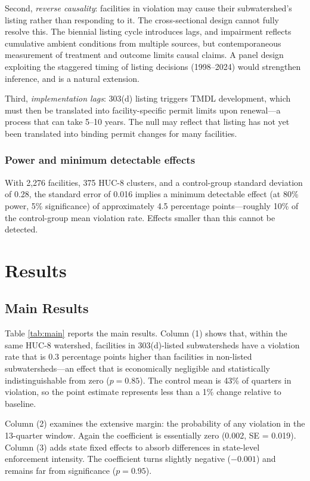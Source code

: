 \documentclass[12pt]{article}
\begin{document}
Second, \textit{reverse causality}: facilities in violation may cause their subwatershed's listing rather than responding to it. The cross-sectional design cannot fully resolve this. The biennial listing cycle introduces lags, and impairment reflects cumulative ambient conditions from multiple sources, but contemporaneous measurement of treatment and outcome limits causal claims. A panel design exploiting the staggered timing of listing decisions (1998--2024) would strengthen inference, and is a natural extension.

Third, \textit{implementation lags}: 303(d) listing triggers TMDL development, which must then be translated into facility-specific permit limits upon renewal---a process that can take 5--10 years. The null may reflect that listing has not yet been translated into binding permit changes for many facilities.

\subsubsection*{Power and minimum detectable effects} With 2,276 facilities, 375 HUC-8 clusters, and a control-group standard deviation of 0.28, the standard error of 0.016 implies a minimum detectable effect (at 80\% power, 5\% significance) of approximately 4.5 percentage points---roughly 10\% of the control-group mean violation rate. Effects smaller than this cannot be detected.


\section{Results}

\subsection{Main Results}



Table \ref{tab:main} reports the main results. Column (1) shows that, within the same HUC-8 watershed, facilities in 303(d)-listed subwatersheds have a violation rate that is 0.3 percentage points higher than facilities in non-listed subwatersheds---an effect that is economically negligible and statistically indistinguishable from zero ($p = 0.85$). The control mean is 43\% of quarters in violation, so the point estimate represents less than a 1\% change relative to baseline.

Column (2) examines the extensive margin: the probability of any violation in the 13-quarter window. Again the coefficient is essentially zero (0.002, SE = 0.019). Column (3) adds state fixed effects to absorb differences in state-level enforcement intensity. The coefficient turns slightly negative ($-0.001$) and remains far from significance ($p = 0.95$).
\end{document}
